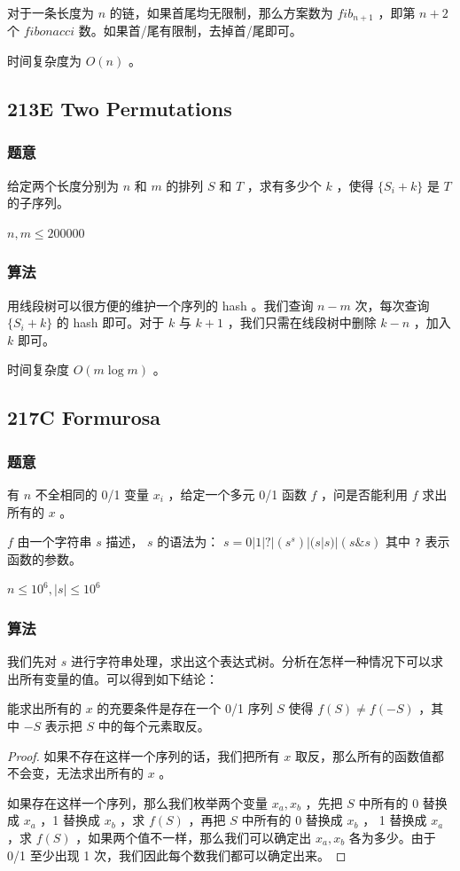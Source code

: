 \documentclass[11pt]{article}
\begin{document}
对于一条长度为 $n$ 的链，如果首尾均无限制，那么方案数为 $fib_{n + 1}$ ，即第 $n + 2$ 个 $fibonacci$ 数。如果首/尾有限制，去掉首/尾即可。

时间复杂度为 $O(n)$ 。
\subsection{213E  Two Permutations}
\label{sec-12-7}
\subsubsection{题意}
\label{sec-12-7-1}

给定两个长度分别为 $n$ 和 $m$ 的排列 $S$ 和 $T$ ，求有多少个 $k$ ，使得 $\{S_i + k\}$ 是 $T$ 的子序列。

$n, m \leq 200000$
\subsubsection{算法}
\label{sec-12-7-2}

用线段树可以很方便的维护一个序列的 hash 。我们查询 $n - m$ 次，每次查询 $\{S_i + k\}$ 的 hash 即可。对于 $k$ 与 $k + 1$ ，我们只需在线段树中删除 $k - n$ ，加入 $k$ 即可。

时间复杂度 $O(m \log m)$ 。
\subsection{217C  Formurosa}
\label{sec-12-8}
\subsubsection{题意}
\label{sec-12-8-1}

有 $n$ 不全相同的 0/1 变量 $x_i$ ，给定一个多元 0/1 函数 $f$ ，问是否能利用 $f$ 求出所有的 $x$ 。

$f$ 由一个字符串 $s$ 描述， $s$ 的语法为： $s = 0 | 1 | ? | (s ^ s) | (s | s) | (s \& s)$ 其中 \texttt{?} 表示函数的参数。

$n \leq 10^6, |s| \leq 10^6$
\subsubsection{算法}
\label{sec-12-8-2}

我们先对 $s$ 进行字符串处理，求出这个表达式树。分析在怎样一种情况下可以求出所有变量的值。可以得到如下结论：

\begin{theorem}
能求出所有的 $x$ 的充要条件是存在一个 0/1 序列 $S$ 使得 $f(S) \neq f(-S)$ ，其中 $-S$ 表示把 $S$ 中的每个元素取反。
\end{theorem}
\begin{proof}
如果不存在这样一个序列的话，我们把所有 $x$ 取反，那么所有的函数值都不会变，无法求出所有的 $x$ 。

如果存在这样一个序列，那么我们枚举两个变量 $x_a, x_b$ ，先把 $S$ 中所有的 0 替换成 $x_a$ ，1 替换成 $x_b$ ，求 $f(S)$ ，再把 $S$ 中所有的 0 替换成 $x_b$ ， 1 替换成 $x_a$ ，求 $f(S)$ ，如果两个值不一样，那么我们可以确定出 $x_a, x_b$ 各为多少。由于 0/1 至少出现 1 次，我们因此每个数我们都可以确定出来。
\end{proof}
\end{document}
